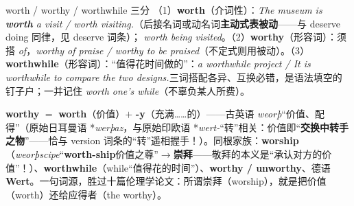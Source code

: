 \documentclass[../main.tex]{subfiles}
\begin{document}
\begin{gram}{worth / worthy / worthwhile 三分}
（1）\textbf{worth}（介词性）：\textit{The museum is \textbf{worth} a visit / worth visiting.}（后接名词或动名词\textbf{主动式表被动}——与 deserve doing 同律，见 deserve 词条）； \textit{worth being visited}。（2）\textbf{worthy}（形容词）：须搭 \textit{of}，\textit{worthy of praise / worthy to be praised}（不定式则用被动）。（3）\textbf{worthwhile}（形容词）：“值得花时间做的”：\textit{a worthwhile project / It is worthwhile to compare the two designs.}三词搭配各异、互换必错，是语法填空的钉子户；一并记住 \textit{worth one's while}（不辜负某人所费）。
\end{gram}

\begin{origin}
\textbf{worthy} $=$ \textbf{worth}（价值）$+$ \textbf{-y}（充满……的）——古英语 \textit{weorþ}“价值、配得”（原始日耳曼语 *\textit{werþaz}，与原始印欧语 *\textit{wert-}“转”相关：价值即“\textbf{交换中转手之物}”——恰与 version 词条的“转”遥相握手！）。同根家族：\textbf{worship}（\textit{weorþscipe}“\textbf{worth-ship}价值之尊”$\to$\textbf{崇拜}——敬拜的本义是“承认对方的价值”！）、\textbf{worthwhile}（while“值得花的时间”）、\textbf{worthy / unworthy}、德语 \textbf{Wert}。一句词源，胜过十篇伦理学论文：所谓崇拜（worship），就是把价值（worth）还给应得者（the worthy）。
\end{origin}
\end{document}
